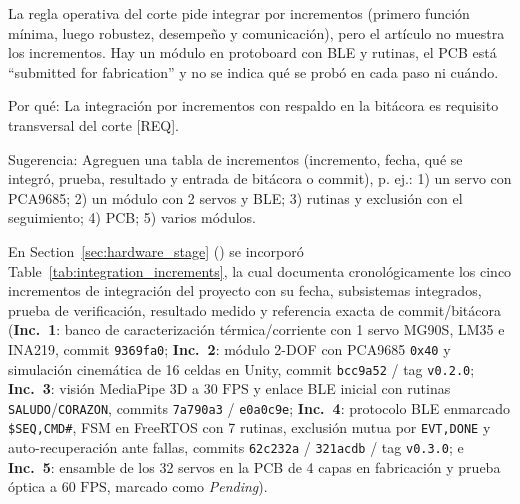 \documentclass{LabDSTresponse}
\begin{document}
{La regla operativa del corte pide integrar por incrementos (primero función mínima, luego robustez, desempeño y comunicación), pero el artículo no muestra los incrementos. Hay un módulo en protoboard con BLE y rutinas, el PCB está “submitted for fabrication” y no se indica qué se probó en cada paso ni cuándo.

Por qué: La integración por incrementos con respaldo en la bitácora es requisito transversal del corte [REQ].

Sugerencia: Agreguen una tabla de incrementos (incremento, fecha, qué se integró, prueba, resultado y entrada de bitácora o commit), p. ej.: 1) un servo con PCA9685; 2) un módulo con 2 servos y BLE; 3) rutinas y exclusión con el seguimiento; 4) PCB; 5) varios módulos.}
{En Section~\ref{sec:hardware_stage} () se incorporó Table~\ref{tab:integration_increments}, la cual documenta cronológicamente los cinco incrementos de integración del proyecto con su fecha, subsistemas integrados, prueba de verificación, resultado medido y referencia exacta de commit/bitácora (\textbf{Inc.~1}: banco de caracterización térmica/corriente con 1 servo MG90S, LM35 e INA219, commit \texttt{9369fa0}; \textbf{Inc.~2}: módulo 2-DOF con PCA9685 \texttt{0x40} y simulación cinemática de 16 celdas en Unity, commit \texttt{bcc9a52} / tag \texttt{v0.2.0}; \textbf{Inc.~3}: visión MediaPipe 3D a $30\text{ FPS}$ y enlace BLE inicial con rutinas \texttt{SALUDO}/\texttt{CORAZON}, commits \texttt{7a790a3} / \texttt{e0a0c9e}; \textbf{Inc.~4}: protocolo BLE enmarcado \texttt{\$SEQ,CMD\#}, FSM en FreeRTOS con 7 rutinas, exclusión mutua por \texttt{EVT,DONE} y auto-recuperación ante fallas, commits \texttt{62c232a} / \texttt{321acdb} / tag \texttt{v0.3.0}; e \textbf{Inc.~5}: ensamble de los 32 servos en la PCB de 4 capas en fabricación y prueba óptica a $60\text{ FPS}$, marcado como \textit{Pending}).}
\end{document}
